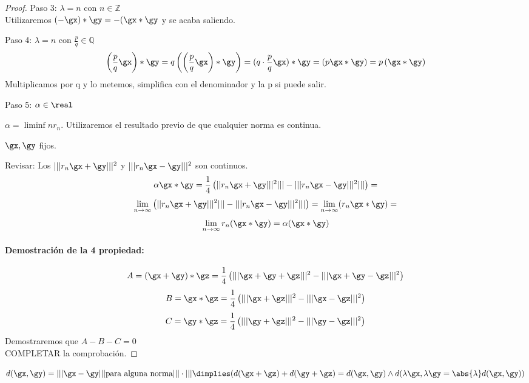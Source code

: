 \documentclass[a4paper,10pt]{apuntes}
\begin{document}
\begin{proof}
Paso 3: $\lambda = n$ con $n \in \mathbb{Z}$\\
Utilizaremos $(-\gx) * \gy = -(\gx*\gy$ y se acaba saliendo.

Paso 4: $\lambda = n$ con $\frac{p}{q} \in \mathbb{Q}$
$$\left(\frac{p}{q}\gx\right)*\gy = q\left(\left(\frac{p}{q}\gx\right)*\gy\right) = (q\cdot\frac{p}{q}\gx)*\gy = \left(p\gx*\gy\right) = p\left(\gx*\gy\right)$$ Multiplicamos por q y lo metemos, simplifica con el denominador y la p si puede salir.

Paso 5: $\alpha \in \real$

$\alpha = \liminf{n} r_n$. Utilizaremos el resultado previo de que cualquier norma es continua.

$\gx, \gy$ fijos.

Revisar: Los $|||r_n \gx + \gy|||^2$ y  $|||r_n \gx - \gy|||^2$ son continuos.
$$\alpha \gx*\gy = \frac{1}{4}\left(||r_n \gx + \gy|||^2||| -|||r_n \gx - \gy|||^2||| \right) =$$
$$\lim_{n\to\infty} \left(||r_n \gx + \gy|||^2||| -|||r_n \gx - \gy|||^2||| \right) = \lim_{n\to\infty} (r_n\gx*\gy) = $$
$$\lim_{n\to\infty} r_n(\gx*\gy) = \alpha (\gx*\gy)$$
\paragraph{Demostración de la 4 propiedad:}
$$A = (\gx+\gy)*\gz = \frac{1}{4} \left( |||\gx+\gy+\gz|||^2 - |||\gx+\gy-\gz|||^2\right)$$
$$B =\gx*\gz = \frac{1}{4} \left( |||\gx+\gz|||^2 - |||\gx-\gz|||^2\right)$$
$$C =\gy*\gz = \frac{1}{4} \left( |||\gy+\gz|||^2 - |||\gy-\gz|||^2\right)$$
Demostraremos que $A-B-C=0$\\
COMPLETAR la comprobación.
\end{proof}
\begin{remark}
$d(\gx,\gy) = |||\gx-\gy||| \text{para alguna norma}|||\cdot||| \dimplies (d(\gx+\gz)+d(\gy+\gz) = d(\gx,\gy) \wedge d(\lambda \gx,\lambda \gy = \abs{\lambda} d(\gx,\gy))$
\end{remark}
\end{document}
